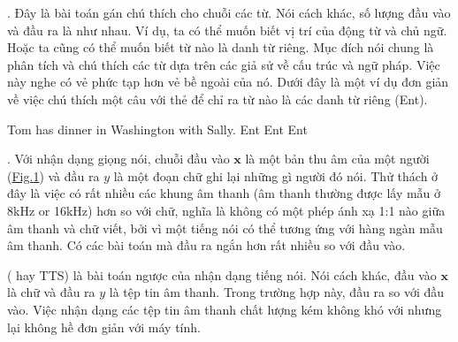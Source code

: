\documentclass[letterpaper,11pt,english]{sphinxmanual}
\let\sphinxpxdimen\pdfpxdimen\else\newdimen\sphinxpxdimen
\begin{document}
. Đây là bài toán gán chú thích cho
chuỗi các từ. Nói cách khác, số lượng đầu vào và đầu ra là như nhau. Ví
dụ, ta có thể muốn biết vị trí của động từ và chủ ngữ. Hoặc ta cũng có
thể muốn biết từ nào là danh từ riêng. Mục đích nói chung là phân tích
và chú thích các từ dựa trên các giả sử về cấu trúc và ngữ pháp. Việc
này nghe có vẻ phức tạp hơn vẻ bề ngoài của nó. Dưới đây là một ví dụ
đơn giản về việc chú thích một câu với thẻ để chỉ ra từ nào là các danh
từ riêng (Ent).

\begin{sphinxVerbatim}[commandchars=\\\{\}]
Tom has dinner in Washington with Sally.
Ent  \PYGZhy{}    \PYGZhy{}    \PYGZhy{}     Ent      \PYGZhy{}    Ent
\end{sphinxVerbatim}



. Với nhận dạng giọng nói, chuỗi đầu vào
\(\mathbf{x}\) là một bản thu âm của một người
(\hyperref[\detokenize{chapter_introduction/index_vn:fig-speech}]{Fig.\@ \ref{\detokenize{chapter_introduction/index_vn:fig-speech}}}) và đầu ra \(y\) là một đoạn chữ ghi lại
những gì người đó nói. Thử thách ở đây là việc có rất nhiều các khung âm
thanh (âm thanh thường được lấy mẫu ở 8kHz or 16kHz) hơn so với chữ,
nghĩa là không có một phép ánh xạ 1:1 nào giữa âm thanh và chữ viết, bởi
vì một tiếng nói có thể tương ứng với hàng ngàn mẫu âm thanh. Có các bài
toán  mà đầu ra ngắn hơn rất nhiều so với đầu vào.

\begin{figure}[H]
\centering
\capstart

\noindent\sphinxincludegraphics[width=700\sphinxpxdimen]{{speech}.png}
\caption{}\label{\detokenize{chapter_introduction/index_vn:id15}}\label{\detokenize{chapter_introduction/index_vn:fig-speech}}\end{figure}



 ( hay TTS) là bài toán ngược của
nhận dạng tiếng nói. Nói cách khác, đầu vào \(\mathbf{x}\) là chữ và
đầu ra \(y\) là tệp tin âm thanh. Trong trường hợp này, đầu ra  so với đầu vào. Việc nhận dạng các tệp tin âm thanh chất
lượng kém không khó với  nhưng lại không hề đơn giản với máy
tính.
\end{document}
